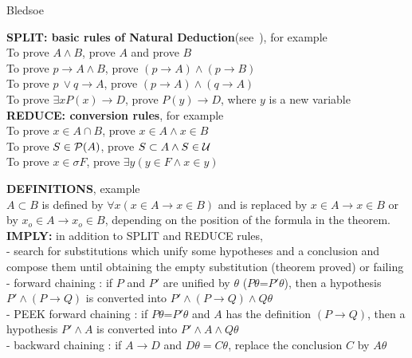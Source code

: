 


\calculusAcronym{\Bledsoe}




\maketitle

\begin{entry}{Bledsoe}  

\begin{calculus}

\textbf {SPLIT: basic rules of Natural Deduction}(see~),
for example\\
To prove $A\land B$, prove $A$ and prove $B$\\
To prove $p \rightarrow  A \land B$, prove $(p \rightarrow A) \land (p \rightarrow B)$\\
To prove $p \ \lor q \rightarrow  A $, prove $(p \rightarrow A) \land (q \rightarrow A)$\\
To prove $\exists x P(x) \rightarrow D$, prove $P(y) \rightarrow D$, where $y$ is a new variable\\
\textbf {REDUCE: conversion rules}, for example\\
To prove $x \in A \cap B$, prove   $x \in A \land x \in B$ \\
To prove $S \in {\cal  P} (A)$, prove $S \subset A \land S \in  {\cal U}$\\
To prove $x \in \sigma F$, prove $\exists y (y \in F \land x \in y)$

\textbf {DEFINITIONS},  example\\
$A \subset B$ is defined by $\forall x(x \in A \rightarrow x \in B)$ and is 
replaced by $x \in A \rightarrow x \in B$ or by 
$x_o \in A \rightarrow x_o \in B$, depending on the position 
of the formula in the theorem.\\
\textbf {IMPLY: }  
in addition to SPLIT and REDUCE rules, \\
- search for substitutions which unify some hypotheses and a conclusion and \\
compose them until obtaining the empty substitution (theorem proved) or failing\\
- forward chaining : if $P$ and $P'$ are unified by $\theta$ ($P \theta$=$P' \theta$), then a hypothesis  
$P' \land (P \rightarrow Q)$ is converted into 
$P' \land (P \rightarrow Q) \land Q \theta$\\
- PEEK forward chaining : if $P\theta$=$P'\theta$ and $A$ has the definition 
$(P \rightarrow Q)$, 
then a hypothesis $P' \land A$ is converted into $P'\land A \land Q \theta$ \\
- backward chaining : if $A \rightarrow D$ and $D \theta = C \theta$, 
replace the conclusion $C$ by $A \theta$
\end{calculus}


\end{entry}
